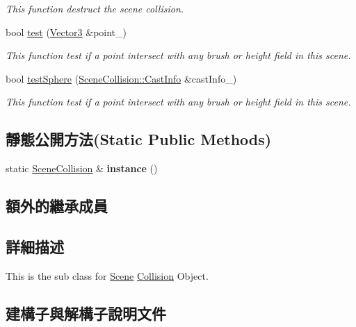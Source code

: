\begin{DoxyCompactItemize}
\begin{DoxyCompactList}\small\item\em This function destruct the scene collision. \end{DoxyCompactList}\item 
bool \hyperlink{class_i_dream_sky_1_1_scene_collision_a80a72828b6602c7ab8e18abef8b6b567}{test} (\hyperlink{class_i_dream_sky_1_1_vector3}{Vector3} \&point\+\_\+)
\begin{DoxyCompactList}\small\item\em This function test if a point intersect with any brush or height field in this scene. \end{DoxyCompactList}\item 
bool \hyperlink{class_i_dream_sky_1_1_scene_collision_aed4f98f10f1b99fe65ca654747158b8d}{test\+Sphere} (\hyperlink{class_i_dream_sky_1_1_scene_collision_1_1_cast_info}{Scene\+Collision\+::\+Cast\+Info} \&cast\+Info\+\_\+)
\begin{DoxyCompactList}\small\item\em This function test if a point intersect with any brush or height field in this scene. \end{DoxyCompactList}\end{DoxyCompactItemize}
\subsection*{靜態公開方法(Static Public Methods)}
\begin{DoxyCompactItemize}
\item 
static \hyperlink{class_i_dream_sky_1_1_scene_collision}{Scene\+Collision} \& {\bfseries instance} ()\hypertarget{class_i_dream_sky_1_1_scene_collision_aec2fbf99a23f4ba51ea47deb76ee2f00}{}\label{class_i_dream_sky_1_1_scene_collision_aec2fbf99a23f4ba51ea47deb76ee2f00}

\end{DoxyCompactItemize}
\subsection*{額外的繼承成員}


\subsection{詳細描述}
This is the sub class for \hyperlink{class_i_dream_sky_1_1_scene}{Scene} \hyperlink{class_i_dream_sky_1_1_collision}{Collision} Object. 

\subsection{建構子與解構子說明文件}
